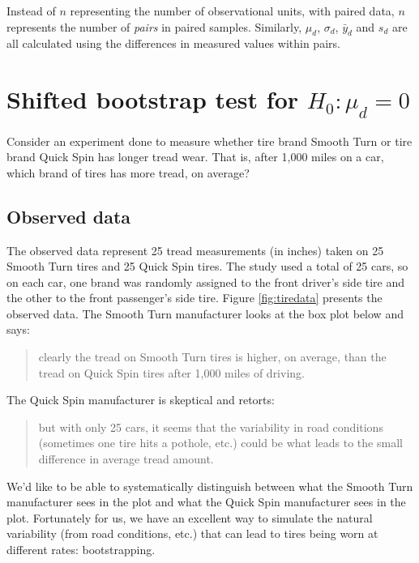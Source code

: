 \documentclass[
  10pt,
  openany]{book}
\theoremstyle{definition}
\theoremstyle{definition}
\theoremstyle{definition}
\theoremstyle{definition}
\theoremstyle{remark}
\begin{document}
Instead of \(n\) representing the number of observational units, with paired data, \(n\) represents the number of \emph{pairs} in paired samples.
Similarly, \(\mu_d\), \(\sigma_d\), \(\bar{y}_d\) and \(s_d\) are all calculated
using the differences in measured values within pairs.

\section{\texorpdfstring{Shifted bootstrap test for \(H_0: \mu_d = 0\)}{Shifted bootstrap test for H\_0: \textbackslash mu\_d = 0}}\label{shifted-bootstrap-test-for-h_0-mu_d-0}

Consider an experiment done to measure whether tire brand Smooth Turn or tire brand Quick Spin has longer tread wear. That is, after 1,000 miles on a car, which brand of tires has more tread, on average?

\subsection{Observed data}\label{observed-data-7}

The observed data represent 25 tread measurements (in inches) taken on 25 Smooth Turn tires and 25 Quick Spin tires.
The study used a total of 25 cars, so on each car, one brand was randomly assigned to the front driver's side tire and the other to the front passenger's side tire.
Figure \ref{fig:tiredata} presents the observed data.
The Smooth Turn manufacturer looks at the box plot below and says:

\begin{quote}
clearly the tread on Smooth Turn tires is higher, on average, than the tread on Quick Spin tires after 1,000 miles of driving.
\end{quote}

The Quick Spin manufacturer is skeptical and retorts:

\begin{quote}
but with only 25 cars, it seems that the variability in road conditions (sometimes one tire hits a pothole, etc.) could be what leads to the small difference in average tread amount.
\end{quote}

We'd like to be able to systematically distinguish between what the Smooth Turn manufacturer sees in the plot and what the Quick Spin manufacturer sees in the plot. Fortunately for us, we have an excellent way to simulate the natural variability (from road conditions, etc.) that can lead to tires being worn at different rates: bootstrapping.
\end{document}
